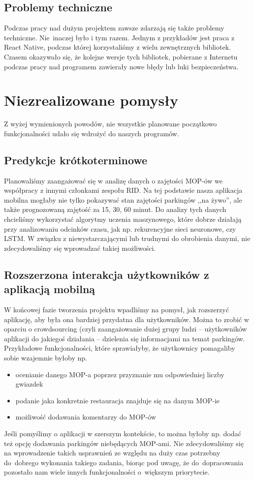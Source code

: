 \subsection{Problemy techniczne}
Podczas pracy nad dużym projektem zawsze zdarzają się także problemy techniczne. Nie~inaczej było i tym razem. 
Jednym z przykładów jest praca z React Native, podczas której korzystaliśmy z wielu zewnętrznych bibliotek. Czasem okazywało się, że kolejne wersje tych bibliotek, pobierane z Internetu podczas pracy nad programem zawierały nowe błędy lub luki bezpieczeństwa.

\section{Niezrealizowane pomysły}
Z wyżej wymienionych powodów, nie wszystkie planowane początkowo funkcjonalności udało się wdrożyć do naszych programów.
\subsection{Predykcje krótkoterminowe}
Planowaliśmy zaangażować się w analizę danych o zajętości MOP-ów we współpracy z innymi członkami zespołu RID. Na tej podstawie nasza aplikacja mobilna mogłaby nie tylko pokazywać stan zajętości parkingów ,,na żywo'', ale także prognozowaną zajętość za 15, 30, 60 minut. Do analizy tych danych chcieliśmy wykorzystać algorytmy uczenia maszynowego, które dobrze działają przy analizowaniu odcinków czasu, jak np. rekurencyjne sieci neuronowe, czy LSTM. W związku z niewystarczającymi lub trudnymi do obrobienia danymi, nie zdecydowaliśmy się wprowadzać takiej możliwości.
\subsection{Rozszerzona interakcja użytkowników z aplikacją mobilną}
W końcowej fazie tworzenia projektu wpadliśmy na pomysł, jak rozszerzyć aplikację, aby była ona bardziej przydatna dla użytkowników. Można to zrobić w oparciu o crowdsourcing (czyli zaangażowanie dużej grupy ludzi -- użytkowników aplikacji do jakiegoś działania -- dzielenia się informacjami na temat parkingów. Przykładowe funkcjonalności, które sprawiałyby, że użytkownicy pomagaliby sobie wzajemnie byłoby np.
\begin{itemize}
\item ocenianie danego MOP-a poprzez przyznanie mu odpowiedniej liczby gwiazdek
\item podanie jaka konkretnie restauracja znajduje się na danym MOP-ie
\item możliwość dodawania komentarzy do MOP-ów
\end{itemize}
Jeśli pomyślimy o aplikacji w szerszym kontekście, to można byłoby np. dodać też opcję dodawania parkingów niebędących MOP-ami.
Nie zdecydowaliśmy się na wprowadzenie takich usprawnień ze względu na duży czas potrzebny do~dobrego wykonania takiego zadania, biorąc pod uwagę, że do~dopracowania pozostało nam wiele innych funkcjonalności o~większym priorytecie.
